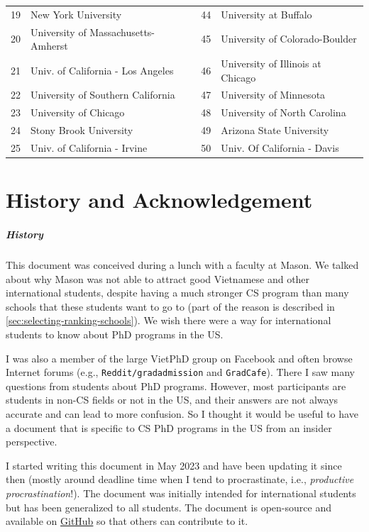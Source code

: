 \documentclass[oneside,11pt,dvipsnames]{book}
\newcommand{\red}[1]{{\color{red}{#1}}}
\begin{document}
\begin{table}
\begin{tabular}{rl|rl}
    19 & New York University  & 44&  University at Buffalo\red{$^*$}\\
    20 &  University of Massachusetts-Amherst\red{$^*$} &45& University of Colorado-Boulder \\
    21 & Univ. of California - Los Angeles &46& University of Illinois at Chicago  \\
    22 & University of Southern California &47& University of Minnesota \\
    23 & University of Chicago &48& University of North Carolina\red{$^*$} \\
    24 & Stony Brook University\red{$^*$} &49& Arizona State University\red{$^*$} \\
    25 &  Univ. of California - Irvine&50& Univ. Of California - Davis \\
    \bottomrule
  \end{tabular}
\end{table}

\chapter{History and Acknowledgement}\label{sec:ack}
\paragraph{History} This document was conceived during a lunch with a faculty at Mason.  We talked about why Mason was not able to attract good Vietnamese and other international students, despite having a much stronger CS program than many schools that these students want to go to (part of the reason is described in \autoref{sec:selecting-ranking-schools}). We wish there were a way for international students to know about PhD programs in the US.

I was also a member of the large VietPhD group on Facebook and often browse Internet forums (e.g., \texttt{Reddit/gradadmission} and \texttt{GradCafe}). There I saw many questions from students about PhD programs.  However, most participants are students in non-CS fields or not in the US, and their answers are not always accurate and can lead to more confusion. So I thought it would be useful to have a document that is specific to CS PhD programs in the US from an insider perspective.

I started writing this document in May 2023 and have been updating it since then (mostly around deadline time when I tend to procrastinate, i.e., \emph{productive procrastination}!). The document was initially intended for international students but has been generalized to all students.
The document is open-source and available on \href{https://github.com/nguyenthanhvuh/phd-cs-us}{GitHub} so that others can contribute to it.
\end{document}
